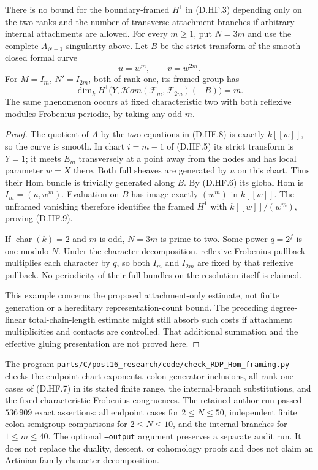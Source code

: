 \begin{example}
\label{D:A-chain-internal-framing-obstruction}
There is no bound for the boundary-framed $H^1$ in
(D.HF.3) depending only on the two ranks and the number of transverse
attachment branches if arbitrary internal attachments are allowed.
For every $m\ge1$, put $N=3m$ and use the complete $A_{N-1}$
singularity above. Let $B$ be the strict transform of the smooth
closed formal curve
\[
                    u=w^m,\qquad v=w^{2m}.             \tag{D.HF.8}
\]
For $M=I_m$, $N'=I_{2m}$, both of rank one, its framed group has
\[
 \dim_kH^1\bigl(Y,\mathcal Hom(\mathcal F_m,
                                  \mathcal F_{2m})(-B)\bigr)=m.
                                                               \tag{D.HF.9}
\]
The same phenomenon occurs at fixed characteristic two with both
reflexive modules Frobenius-periodic, by taking any odd $m$.
\end{example}
\begin{proof}
The quotient of $A$ by the two equations in (D.HF.8) is exactly
$k[[w]]$, so the curve is smooth. In chart $i=m-1$ of (D.HF.5)
its strict transform is $Y=1$; it meets $E_m$ transversely at a
point away from the nodes and has local parameter $w=X$ there.
Both full sheaves are generated by $u$ on this chart. Thus their
Hom bundle is trivially generated along $B$.
By (D.HF.6) its global Hom is $I_m=(u,w^m)$. Evaluation on $B$
has image exactly $(w^m)$ in $k[[w]]$. The unframed vanishing
therefore identifies the framed $H^1$ with $k[[w]]/(w^m)$,
proving (D.HF.9).

If $\operatorname{char}(k)=2$ and $m$ is odd, $N=3m$ is prime
to two. Some power $q=2^f$ is one modulo $N$. Under the
character decomposition, reflexive Frobenius pullback multiplies
each character by $q$, so both $I_m$ and $I_{2m}$ are fixed by
that reflexive pullback. No periodicity of their full bundles on
the resolution itself is claimed.

This example concerns the proposed attachment-only estimate, not
finite generation or a hereditary representation-count bound.
The preceding degree-linear total-chain-length estimate might
still absorb such costs if attachment multiplicities and contacts
are controlled. That additional summation and the effective
gluing presentation are not proved here.
\end{proof}

\begin{remark}
The program
\nolinkurl{parts/C/post16_research/code/check_RDP_Hom_framing.py}
checks the endpoint chart exponents, colon-generator inclusions,
all rank-one cases of (D.HF.7) in its stated finite range, the
internal-branch substitutions, and the fixed-characteristic
Frobenius congruences. The retained author run passed $536\,909$
exact assertions: all endpoint cases for $2\le N\le50$, independent
finite colon-semigroup comparisons for $2\le N\le10$, and the
internal branches for $1\le m\le40$.
The optional \texttt{--output} argument preserves a separate audit run.
It does not replace the duality, descent,
or cohomology proofs and does not claim an Artinian-family
character decomposition.
\end{remark}
